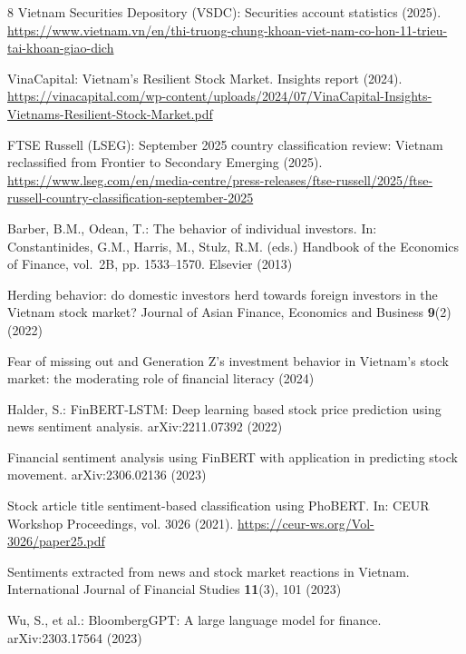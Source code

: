 \documentclass[runningheads]{llncs}
\begin{document}
\begin{thebibliography}{8}
Vietnam Securities Depository (VSDC): Securities account statistics (2025).
\url{https://www.vietnam.vn/en/thi-truong-chung-khoan-viet-nam-co-hon-11-trieu-tai-khoan-giao-dich}

VinaCapital: Vietnam's Resilient Stock Market. Insights report (2024).
\url{https://vinacapital.com/wp-content/uploads/2024/07/VinaCapital-Insights-Vietnams-Resilient-Stock-Market.pdf}

FTSE Russell (LSEG): September 2025 country classification review: Vietnam
reclassified from Frontier to Secondary Emerging (2025).
\url{https://www.lseg.com/en/media-centre/press-releases/ftse-russell/2025/ftse-russell-country-classification-september-2025}

Barber, B.M., Odean, T.: The behavior of individual investors. In: Constantinides,
G.M., Harris, M., Stulz, R.M. (eds.) Handbook of the Economics of Finance, vol.~2B,
pp. 1533--1570. Elsevier (2013)

Herding behavior: do domestic investors herd towards foreign investors in the
Vietnam stock market? Journal of Asian Finance, Economics and Business
\textbf{9}(2) (2022)

Fear of missing out and Generation Z's investment behavior in Vietnam's stock
market: the moderating role of financial literacy (2024)

Halder, S.: FinBERT-LSTM: Deep learning based stock price prediction using news
sentiment analysis. arXiv:2211.07392 (2022)

Financial sentiment analysis using FinBERT with application in predicting stock
movement. arXiv:2306.02136 (2023)

Stock article title sentiment-based classification using PhoBERT. In: CEUR
Workshop Proceedings, vol. 3026 (2021).
\url{https://ceur-ws.org/Vol-3026/paper25.pdf}

Sentiments extracted from news and stock market reactions in Vietnam.
International Journal of Financial Studies \textbf{11}(3), 101 (2023)

Wu, S., et al.: BloombergGPT: A large language model for finance.
arXiv:2303.17564 (2023)


\end{thebibliography}
\end{document}
